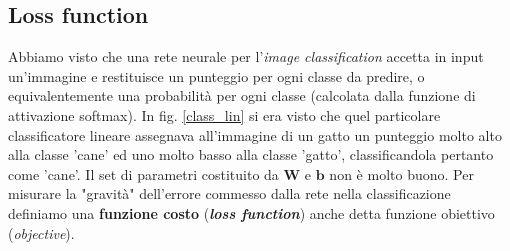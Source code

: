 \subsection{Loss function}
\label{loss}
Abbiamo visto che una rete neurale per l'\textit{image classification} accetta in input un'immagine e restituisce un punteggio per ogni classe da predire, o equivalentemente una probabilità per ogni classe (calcolata dalla funzione di attivazione softmax). In fig. \ref{class_lin} si era visto che quel particolare classificatore lineare assegnava all'immagine di un gatto un punteggio molto alto alla classe 'cane' ed uno molto basso alla classe 'gatto', classificandola pertanto come 'cane'. Il set di parametri costituito da $\mathbf{W}$ e $\mathbf{b}$ non è molto buono. Per misurare la "gravità" dell'errore commesso dalla rete nella classificazione definiamo una \textbf{funzione costo} (\textbf{\textit{loss function}}) anche detta funzione obiettivo (\textit{objective}).


